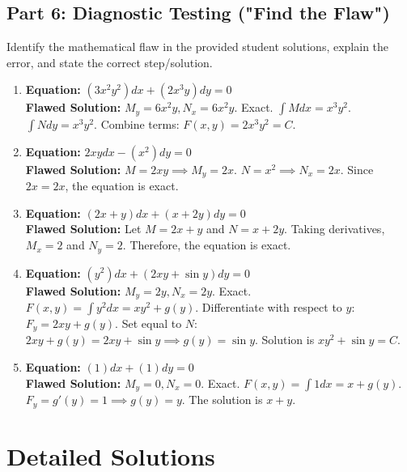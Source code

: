 \documentclass[11pt]{article}
\begin{document}
\subsection*{Part 6: Diagnostic Testing ("Find the Flaw")}
Identify the mathematical flaw in the provided student solutions, explain the error, and state the correct step/solution.
\begin{enumerate}[label=\textbf{\arabic*.}, resume]
    \item \textbf{Equation:} $(3x^2 y^2)dx + (2x^3 y)dy = 0$ \\
    \textbf{Flawed Solution:} $M_y = 6x^2 y, N_x = 6x^2 y$. Exact. $\int M dx = x^3 y^2$. $\int N dy = x^3 y^2$. Combine terms: $F(x,y) = 2x^3 y^2 = C$.
    
    \item \textbf{Equation:} $2xydx - (x^2)dy = 0$ \\
    \textbf{Flawed Solution:} $M = 2xy \implies M_y = 2x$. $N = x^2 \implies N_x = 2x$. Since $2x = 2x$, the equation is exact.
    
    \item \textbf{Equation:} $(2x+y)dx + (x+2y)dy = 0$ \\
    \textbf{Flawed Solution:} Let $M = 2x+y$ and $N = x+2y$. Taking derivatives, $M_x = 2$ and $N_y = 2$. Therefore, the equation is exact.
    
    \item \textbf{Equation:} $(y^2)dx + (2xy + \sin y)dy = 0$ \\
    \textbf{Flawed Solution:} $M_y = 2y, N_x = 2y$. Exact. $F(x,y) = \int y^2 dx = xy^2 + g(y)$. Differentiate with respect to $y$: $F_y = 2xy + g(y)$. Set equal to $N$: $2xy + g(y) = 2xy + \sin y \implies g(y) = \sin y$. Solution is $xy^2 + \sin y = C$.
    
    \item \textbf{Equation:} $(1)dx + (1)dy = 0$ \\
    \textbf{Flawed Solution:} $M_y = 0, N_x = 0$. Exact. $F(x,y) = \int 1 dx = x + g(y)$. $F_y = g'(y) = 1 \implies g(y) = y$. The solution is $x + y$.
\end{enumerate}

\newpage

\section{Detailed Solutions}
\end{document}
